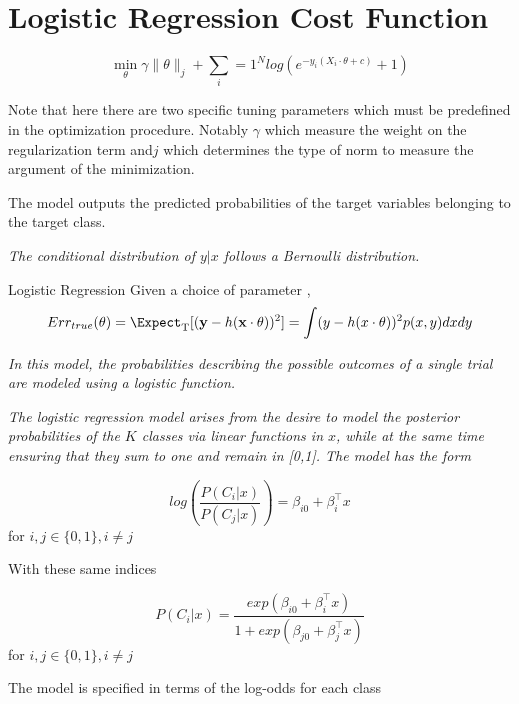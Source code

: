 \section{Logistic Regression Cost Function}

\begin{equation} \label{logit}
 \min_{\theta} \gamma\| \theta\|_{j}  + \sum_i=1^N log(e^{-y_i (X_i \cdot \theta + c )} +1) 
\end{equation}

Note that here there are two specific tuning parameters which must be predefined in the optimization procedure. Notably $\gamma$ which measure the weight on the regularization term and$j$ which determines the type of norm to measure the argument of the minimization.

The model outputs the predicted probabilities of the target variables belonging to the target class.

\textit{The conditional distribution of $y|x$ follows a Bernoulli distribution.}


\begin{definition}{Logistic Regression}
Given a choice of parameter \theta,
\[
    Err_{true}(\theta)  = \Expect_{ \mathrm{T}}[(\textbf{y} - h(\textbf{x} \cdot \theta) )^2] \\
    = \int (y - h(x \cdot \theta) )^2 p(x,y)dxdy
\]
\end{definition}

\textit{In this model, the probabilities describing the possible outcomes of a single trial are modeled using a logistic function.}

\textit{The logistic regression model arises from the desire to model the posterior probabilities of the $K$ classes via linear functions in $x$, while at the same time ensuring that they sum to one and remain in [0,1]. The model has the form }


$$ log( \frac{P(C_i|x)}{P(C_j|x)}) = \beta_{i0}  + \beta_i^\intercal x  $$ for $i,j \in \{0,1\}, i\neq j$

With these same indices 

$$ P(C_i|x) = \frac{ exp(\beta_{i0}  + \beta_i^\intercal x)}{1 + exp(\beta_{j0}  + \beta_j^\intercal x)}   $$ for $i,j \in \{0,1\}, i\neq j$

The model is specified in terms of the log-odds for each class 


\textit{}
\textit{}
\textit{}
